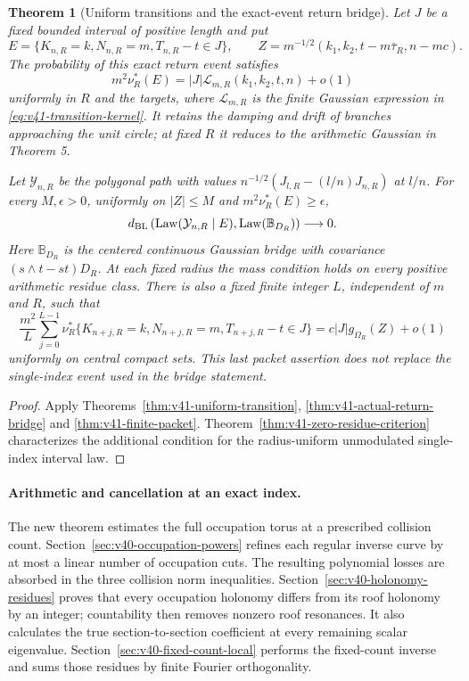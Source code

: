 \documentclass[11pt,reqno]{amsart}
\numberwithin{equation}{section}
\newtheorem{leadtheorem}{Theorem}
\theoremstyle{definition}\newtheorem{definition}[theorem]{Definition}
\theoremstyle{remark}\newtheorem{remark}[theorem]{Remark}
\begin{document}
\begin{leadtheorem}[Uniform transitions and the exact-event return bridge]
\label{thm:intro-v41-bridge}
Let $J$ be a fixed bounded interval of positive length and put
\[
 E=\{K_{n,R}=k,N_{n,R}=m,T_{n,R}-t\in J\},\qquad
 Z=m^{-1/2}(k_1,k_2,t-m\bar\tau_R,n-mc).
\]
The probability of this exact return event satisfies
\[
 m^2\nu_R^*(E)=|J|\mathcal L_{m,R}(k_1,k_2,t,n)+o(1)
\]
uniformly in $R$ and the targets, where $\mathcal L_{m,R}$ is the
finite Gaussian expression in \eqref{eq:v41-transition-kernel}.
It retains the damping and drift of branches approaching the unit
circle; at fixed $R$ it reduces to the arithmetic Gaussian in Theorem 5.

Let $\mathcal Y_{n,R}$ be the polygonal path with values
$n^{-1/2}(J_{l,R}-(l/n)J_{n,R})$ at $l/n$.
For every $M,\epsilon>0$, uniformly on $|Z|\le M$ and
$m^2\nu_R^*(E)\ge\epsilon$,
\[
 d_{\rm BL}\left(\operatorname{Law}(\mathcal Y_{n,R}\mid E),
                         \operatorname{Law}(\mathbb B_{D_R})\right)
                                      \longrightarrow0.
\]
Here $\mathbb B_{D_R}$ is the centered continuous Gaussian bridge with
covariance $(s\wedge t-st)D_R$. At each fixed radius the mass condition
holds on every positive arithmetic residue class. There is also a fixed
finite integer $L$, independent of $m$ and $R$, such that
\[
 \frac{m^2}{L}\sum_{j=0}^{L-1}
 \nu_R^*\{K_{n+j,R}=k,N_{n+j,R}=m,T_{n+j,R}-t\in J\}
                         =c|J|g_{\Omega_R}(Z)+o(1)
\]
uniformly on central compact sets. This last packet assertion does not
replace the single-index event used in the bridge statement.
\end{leadtheorem}
\begin{proof}
Apply Theorems~\ref{thm:v41-uniform-transition},
\ref{thm:v41-actual-return-bridge} and \ref{thm:v41-finite-packet}.
Theorem~\ref{thm:v41-zero-residue-criterion} characterizes the additional
condition for the radius-uniform unmodulated single-index interval law.
\end{proof}

\paragraph{Arithmetic and cancellation at an exact index.}
The new theorem estimates the full occupation torus at a prescribed
collision count. Section~\ref{sec:v40-occupation-powers} refines each
regular inverse curve by at most a linear number of occupation cuts.
The resulting polynomial losses are absorbed in the three collision
norm inequalities. Section~\ref{sec:v40-holonomy-residues} proves
that every occupation holonomy differs from its roof holonomy by an
integer; countability then removes nonzero roof resonances. It also
calculates the true section-to-section coefficient at every remaining
scalar eigenvalue. Section~\ref{sec:v40-fixed-count-local} performs
the fixed-count inverse and sums those residues by finite Fourier
orthogonality.
\end{document}
